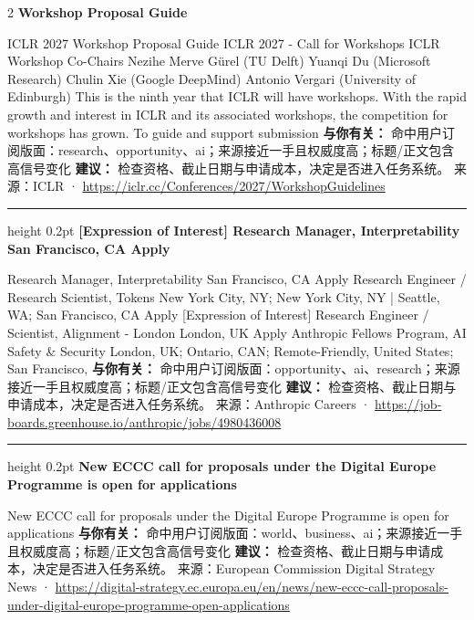 \documentclass[10.5pt]{ctexart}
\begin{document}
\begin{multicols}{2}
{\large\bfseries Workshop Proposal Guide}\par
ICLR 2027 Workshop Proposal Guide ICLR 2027 - Call for Workshops ICLR Workshop Co-Chairs Nezihe Merve Gürel (TU Delft) Yuanqi Du (Microsoft Research) Chulin Xie (Google DeepMind) Antonio Vergari (University of Edinburgh) This is the ninth year that ICLR will have workshops. With the rapid growth and interest in ICLR and its associated workshops, the competition for workshops has grown. To guide and support submission
\textbf{与你有关：} 命中用户订阅版面：research、opportunity、ai；来源接近一手且权威度高；标题/正文包含高信号变化
\textbf{建议：} 检查资格、截止日期与申请成本，决定是否进入任务系统。
{\footnotesize\color{ormuted} 来源：ICLR · \url{https://iclr.cc/Conferences/2027/WorkshopGuidelines}}
\vspace{2mm}
\hrule height 0.2pt
\vspace{2mm}
{\large\bfseries [Expression of Interest] Research Manager, Interpretability San Francisco, CA Apply}\par
[Expression of Interest] Research Manager, Interpretability San Francisco, CA Apply Research Engineer / Research Scientist, Tokens New York City, NY; New York City, NY | Seattle, WA; San Francisco, CA Apply [Expression of Interest] Research Engineer / Scientist, Alignment - London London, UK Apply Anthropic Fellows Program, AI Safety \& Security London, UK; Ontario, CAN; Remote-Friendly, United States; San Francisco, 
\textbf{与你有关：} 命中用户订阅版面：opportunity、ai、research；来源接近一手且权威度高；标题/正文包含高信号变化
\textbf{建议：} 检查资格、截止日期与申请成本，决定是否进入任务系统。
{\footnotesize\color{ormuted} 来源：Anthropic Careers · \url{https://job-boards.greenhouse.io/anthropic/jobs/4980436008}}
\vspace{2mm}
\hrule height 0.2pt
\vspace{2mm}
{\large\bfseries New ECCC call for proposals under the Digital Europe Programme is open for applications}\par
New ECCC call for proposals under the Digital Europe Programme is open for applications
\textbf{与你有关：} 命中用户订阅版面：world、business、ai；来源接近一手且权威度高；标题/正文包含高信号变化
\textbf{建议：} 检查资格、截止日期与申请成本，决定是否进入任务系统。
{\footnotesize\color{ormuted} 来源：European Commission Digital Strategy News · \url{https://digital-strategy.ec.europa.eu/en/news/new-eccc-call-proposals-under-digital-europe-programme-open-applications}}
\vspace{2mm}

\end{multicols}
\end{document}
